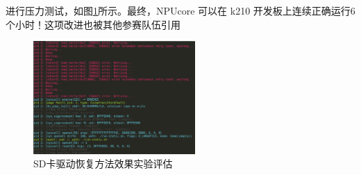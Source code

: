 进行压力测试，如图\ref{fig:SD recovery}所示。最终，NPUcore 可以在 k210 开发板上连续正确运行6个小时！这项改进也被其他参赛队伍引用

\begin{figure}[h]
	\centering
	\includegraphics[width=0.55\textwidth]{figures/10-04-SD卡驱动读写错误恢复方法效果实验评估.png}
	\caption{SD卡驱动恢复方法效果实验评估}
	\label{fig:SD recovery}
\end{figure}


